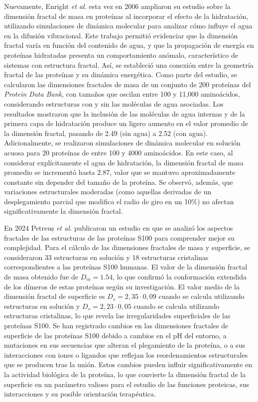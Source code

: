  Nuevamente, Enright \textit{et al.}\cite{Enright2006} esta vez en 2006 ampliaron su estudio sobre la dimensión fractal de masa en proteínas al incorporar el efecto de la hidratación, utilizando simulaciones de dinámica molecular para analizar cómo influye el agua en la difusión vibracional. Este trabajo permitió evidenciar que la dimensión fractal varía en función del contenido de agua, y que la propagación de energía en proteínas hidratadas presenta un comportamiento anómalo, característico de sistemas con estructura fractal. Así, se estableció una conexión entre la geometría fractal de las proteínas y su dinámica energética. Como parte del estudio, se calcularon las dimensiones fractales de masa de un conjunto de 200 proteínas del \textit{Protein Data Bank}, con tamaños que oscilan entre 100 y 11,000 aminoácidos, considerando estructuras con y sin las moléculas de agua asociadas. Los resultados mostraron que la inclusión de las moléculas de agua internas y de la primera capa de hidratación produce un ligero aumento en el valor promedio de la dimensión fractal, pasando de 2.49 (sin agua) a 2.52 (con agua). Adicionalmente, se realizaron simulaciones de dinámica molecular en solución acuosa para 20 proteínas de entre 100 y 4000 aminoácidos. En este caso, al considerar explícitamente el agua de hidratación, la dimensión fractal de masa promedio se incrementó hasta 2.87, valor que se mantuvo aproximadamente constante sin depender del tamaño de la proteína. Se observó, además, que variaciones estructurales moderadas (como aquellas derivadas de un desplegamiento parcial que modifica el radio de giro en un 10\%) no afectan significativamente la dimensión fractal.


En 2024 Petreuș \textit{et al.} publicaron un estudio en que se analizó los aspectos fractales de las estructuras de las proteínas S100 para comprender mejor su complejidad. Para el cálculo de las dimensiones fractales de masa y superficie, se consideraron 33 estructuras en solución y 18 estructuras cristalinas correspondientes a las proteínas S100 humanas. El valor de la dimensión fractal de masa obtenido fue de $D_m = 1.54$, lo que confirmó la conformación extendida de los dímeros de estas proteínas según su investigación. El valor medio de la dimensión fractal de superficie es $D_s = 2,35 \cdot 0,09 $ cuando se calcula utilizando estructuras en solución y $D_s = 2,23 \cdot 0,05$ cuando se calcula utilizando estructuras cristalinas, lo que revela las irregularidades superficiales de las proteínas S100. Se han registrado cambios en las dimensiones fractales de superficie de las proteínas S100 debido a cambios en el pH del entorno, a mutaciones en sus secuencias que alteran el plegamiento de la proteína, o a sus interacciones con iones o ligandos que reflejan los reordenamientos estructurales que se producen tras la unión. Estos cambios pueden influir significativamente en la actividad biológica de la proteína, lo que convierte la dimensión fractal de la superficie en un parámetro valioso para el estudio de las funciones proteicas, sus interacciones y su posible orientación terapéutica. 

